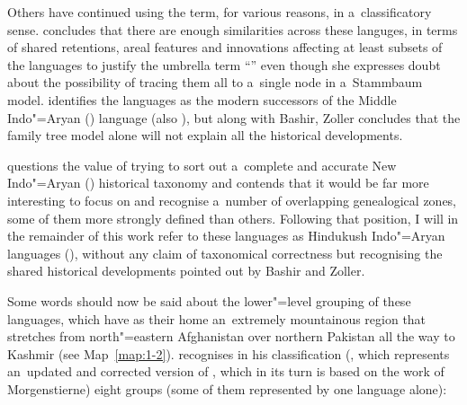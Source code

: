 Others have continued using the term, for various reasons, in a~classificatory sense. \citet[822]{bashir2003} concludes that there are enough similarities across these languges, in terms of shared retentions, areal features and innovations affecting at least subsets of the languages to justify the umbrella term ``\iliDardic'' even though she expresses doubt about the possibility of tracing them all to a~single node in a~Stammbaum model. \citet[10--11]{zoller2005} identifies the \iliDardic languages as the modern successors of the Middle Indo"=Aryan (\iliMIA) language \iliGandhari (also \iliGandhari \iliPrakrit), but along with Bashir, Zoller concludes that the family tree model alone will not explain all the historical developments. 


\citet[460]{masica1991} questions the value of trying to sort out a~complete and accurate New Indo"=Aryan (\iliNIA) historical taxonomy and contends that it would be far more interesting to focus on and recognise a~number of overlapping genealogical zones, some of them more strongly defined than others. Following that position, I will in the remainder of this work refer to these languages as Hindukush Indo"=Aryan languages (\iliHKIA), without any claim of taxonomical correctness but recognising the shared historical developments pointed out by Bashir and Zoller. 


Some words should now be said about the lower"=level grouping of these \iliHKIA languages, which have as their home an~extremely mountainous region that stretches from north"=eastern Afghanistan over northern Pakistan all the way to Kashmir (see Map~\ref{map:1-2}). \citeauthor{strand2001} recognises in his classification (\citeyear[258]{strand2001}, which represents an~updated and corrected version of \citealt{strand1973}, which in its turn is based on the work of Morgenstierne) eight groups (some of them represented by one language alone): 

